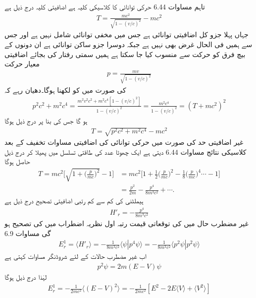تاہم مساوات 6.44 حرکی توانائی کا کلاسیکی کلیہ ہے اضافیتی کلیہ درج ذیل ہے 
\begin{align}
T = \frac{mc^2}{\sqrt{1 - (v/c)^2}} - mc^2
\end{align}
جہاں پہلا جزو کل اضافیتی  توانائی ہے جس میں مخفی توانائی شامل نہیں ہے اور جس سے ہمیں فی الحال غرض بھی نہیں ہے جبکہ دوسرا جزو ساکن توانائی ہے ان دونوں کے بیچ فرق کو حرکت سے منسوب کیا جا سکتا ہے ہمیں سمتی رفتار کی بجائے  اضافیتی معیار حرکت
\begin{align}
p = \frac{mv}{\sqrt{1 - (v/c)^2}}
\end{align}
 کی صورت میں  کو لکھنا ہوگا۔دھیان رہے کہ
\begin{align*}
p^2 c^2 + m^2 c^4 = \frac{m^2 v^2 c^2 + m^2 c^4 [1 - (v/c)^2]}{1 - (v/c)^2} = \frac{m^2 c^4}{1 - (v/c)^2} = (T + mc^2)^2
\end{align*}
ہو گا جس کی بنا پر درج ذیل ہوگا 
\begin{align}
T = \sqrt{p^2 c^2 + m^2 c^4} - mc^2
\end{align}
غیر اضافیتی حد  کی صورت میں حرکی توانائی کی اضافیتی مساوات تخفیف کے بعد کلاسیکی نتائج مساوات 6.44 دیتی ہے ایک چھوٹا عدد  کی طاقتی تسلسل میں پھیلا کر درج ذیل حاصل ہوگا 
\begin{align}
T = mc^2 \big [ \sqrt{1 + \big(\frac{p}{mc}\big)^2}  - 1 \big ] &= mc^2 \big [ 1 + \frac{1}{2} \big(\frac{p}{mc}\big)^2 - \frac{1}{8} \big(\frac{p}{mc}\big)^4 \cdots - 1 \big ] \nonumber \\
&= \frac{p^2}{2m} - \frac{p^4}{8m^3 c^2} + \cdots .
\end{align}
ہیملٹنی کی کم سے کم رتبی اضافیتی تصحیح درج ذیل ہے 
\begin{align}
H'_r = - \frac{p^4}{8m^3 c^2}
\end{align}
غیر مضطرب حال میں  کی توقعاتی قیمت رتبہ اول نظریہ اضطراب میں  کی تصحیح  ہو گی مساوات 6.9 
\begin{align}
E_r^1 = \langle H'_r \rangle = - \frac{1}{8 m^3 c^2} \langle \psi | p^4 \psi \rangle = - \frac{1}{8m^3 c^2} \langle p^2 \psi | p^2 \psi \rangle
\end{align}
اب غیر مضطرب حالات کے لئے شروڈنگر مساوات کہتی ہے 
\begin{align}
p^2 \psi = 2m (E - V) \psi
\end{align}
 لہٰذا   درج ذیل ہوگا 
\begin{align}
E_r^1 = - \frac{1}{2mc^2} \langle (E - V)^2 \rangle = - \frac{1}{2mc^2} [E^2 - 2E \langle V \rangle + \langle V^2 \rangle]
\end{align}

